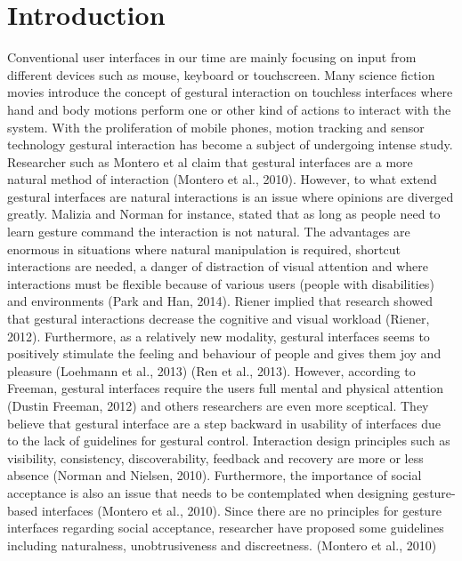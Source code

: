 \chapter{Introduction}
\label{chap:introduction}

Conventional user interfaces in our time are mainly focusing on input from different devices such as mouse, keyboard or touchscreen. Many science fiction movies introduce the concept of gestural interaction on touchless interfaces where hand and body motions perform one or other kind of actions to interact with the system. With the proliferation of mobile phones, motion tracking and sensor technology gestural interaction has become a subject of undergoing intense study. Researcher such as Montero et al claim that gestural interfaces are a more natural method of interaction (Montero et al., 2010). However, to what extend gestural interfaces are natural interactions is an issue where opinions are diverged greatly. Malizia and Norman for instance, stated that as long as people need to learn gesture command the interaction is not natural. The advantages are enormous in situations where natural manipulation is required, shortcut interactions are needed, a danger of distraction of visual attention and where interactions must be flexible because of various users (people with disabilities) and environments (Park and Han, 2014). Riener implied that research showed that gestural interactions decrease the cognitive and visual workload (Riener, 2012). Furthermore, as a relatively new modality, gestural interfaces seems to positively stimulate the feeling and behaviour of people and gives them joy and pleasure (Loehmann et al., 2013) (Ren et al., 2013). However, according to Freeman, gestural interfaces require the users full mental and physical attention (Dustin Freeman, 2012) and others researchers are even more sceptical. They believe that gestural interface are a step backward in usability of interfaces due to the lack of guidelines for gestural control. Interaction design principles such as visibility, consistency, discoverability, feedback and recovery are more or less absence  (Norman and Nielsen, 2010). Furthermore, the importance of social acceptance is also an issue that needs to be contemplated when designing gesture-based interfaces (Montero et al., 2010). Since there are no principles for gesture interfaces regarding social acceptance, researcher have proposed some guidelines including naturalness, unobtrusiveness and discreetness. (Montero et al., 2010) 




